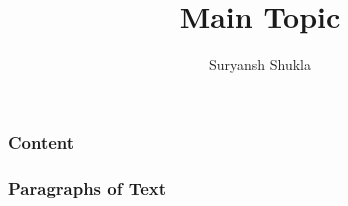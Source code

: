 \documentclass{beamer}
\title[Short title]{Main Topic }
\author{Suryansh Shukla}
\institute[] {
\medskip
}
\begin{document}
\begin{frame}
\titlepage %
\end{frame}

\begin{frame}
\frametitle{Content} 
\tableofcontents 
\end{frame}

\begin{frame}
\frametitle{Paragraphs of Text}
\end{frame}
\end{document}
